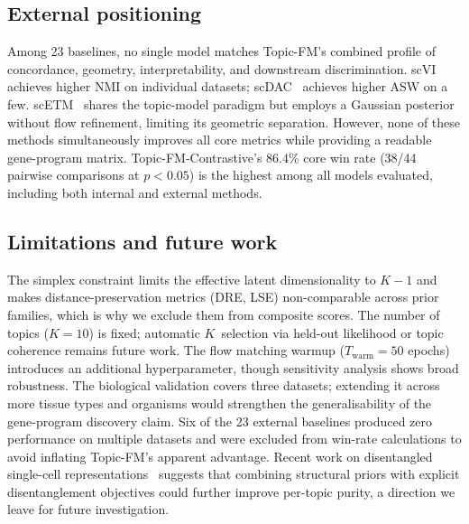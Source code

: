 \documentclass[biology,article,submit,pdftex,moreauthors]{Definitions/mdpi}
\begin{document}
\subsection{External positioning}
Among 23 baselines, no single model matches Topic-FM's combined profile of concordance, geometry, interpretability, and downstream discrimination. scVI~\cite{lopez2018deep} achieves higher NMI on individual datasets; scDAC~\cite{li2023scdac} achieves higher ASW on a few. scETM~\cite{zhao2021scetm} shares the topic-model paradigm but employs a Gaussian posterior without flow refinement, limiting its geometric separation. However, none of these methods simultaneously improves all core metrics while providing a readable gene-program matrix. Topic-FM-Contrastive's 86.4\% core win rate (38/44 pairwise comparisons at $p < 0.05$) is the highest among all models evaluated, including both internal and external methods.

\subsection{Limitations and future work}
The simplex constraint limits the effective latent dimensionality to $K{-}1$ and makes distance-preservation metrics (DRE, LSE) non-comparable across prior families, which is why we exclude them from composite scores. The number of topics ($K{=}10$) is fixed; automatic $K$~selection via held-out likelihood or topic coherence remains future work. The flow matching warmup ($T_\text{warm}{=}50$ epochs) introduces an additional hyperparameter, though sensitivity analysis shows broad robustness. The biological validation covers three datasets; extending it across more tissue types and organisms would strengthen the generalisability of the gene-program discovery claim. Six of the 23 external baselines produced zero performance on multiple datasets and were excluded from win-rate calculations to avoid inflating Topic-FM's apparent advantage. Recent work on disentangled single-cell representations~\cite{moinfar2024drvi} suggests that combining structural priors with explicit disentanglement objectives could further improve per-topic purity, a direction we leave for future investigation.
\end{document}
